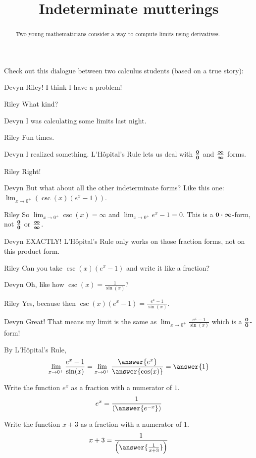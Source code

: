 \documentclass{ximera}
\title[Break-Ground:]{Indeterminate mutterings}
\begin{document}
\begin{abstract}
Two young mathematicians consider a way to compute limits using derivatives.
\end{abstract}
\maketitle

Check out this dialogue between two calculus students (based on a true
story):

\begin{dialogue}
\item[Devyn] Riley! I think I have a problem!
\item[Riley] What kind?
\item[Devyn] I was calculating some limits last night.
\item[Riley] Fun times.
\item[Devyn] I realized something.  L'H\^opital's Rule lets us deal with
	$\boldsymbol{\tfrac{0}{0}}$ and $\boldsymbol{\tfrac{\infty}{\infty}}$ forms. 
\item[Riley] Right!
\item[Devyn] But what about all the other indeterminate forms?  Like this one:
 	$\displaystyle \lim_{x\to 0^+} \left( \csc(x)(e^x-1)\right) $.
\item[Riley] So $\lim_{x\to0^+} \csc(x) = \infty$ and $\lim_{x\to0^+}e^x-1 = 0$.
	This is a $\small\boldsymbol{0\cdot \infty}$-form, not $\boldsymbol{\tfrac{0}{0}}$ or $\boldsymbol{\tfrac{\infty}{\infty}}$.
\item[Devyn] EXACTLY!  L'H\^opital's Rule only works on those fraction forms, not
	on this product form.
\item[Riley] Can you take $\csc(x)(e^x-1)$ and write it like a fraction?
\item[Devyn] Oh, like how $\csc(x) = \frac{1}{\sin(x)}$?
\item[Riley] Yes, because then $\csc(x)(e^x-1) = \frac{e^x-1}{\sin(x)}$.
\item[Devyn] Great!  That means my limit is the same as 
	$\lim_{x\to0^+} \frac{e^x-1}{\sin(x)}$ which is a $\boldsymbol{\tfrac{0}{0}}$-form!
\end{dialogue}

\begin{problem}
	By L'H\^opital's Rule,
	\[ \lim_{x\to0^+}\frac{e^x-1}{\sin(x)} = 
	\lim_{x\to0^+} \frac{\answer{e^x}}{\answer{\cos(x)}} = 
	\answer{1}\]
\end{problem}

\begin{problem}
	Write the function $e^x$ as a fraction with a numerator of $1$.
	\[ e^x = \frac{1}{\left(\answer{e^{-x}}\right)} \]	
\end{problem}

\begin{problem}
	Write the function $x+3$ as a fraction with a numerator of $1$.
	\[ x+3 = \frac{1}{\left(\answer{\frac{1}{x+3}}\right)} \]	
\end{problem}
%
\end{document}
